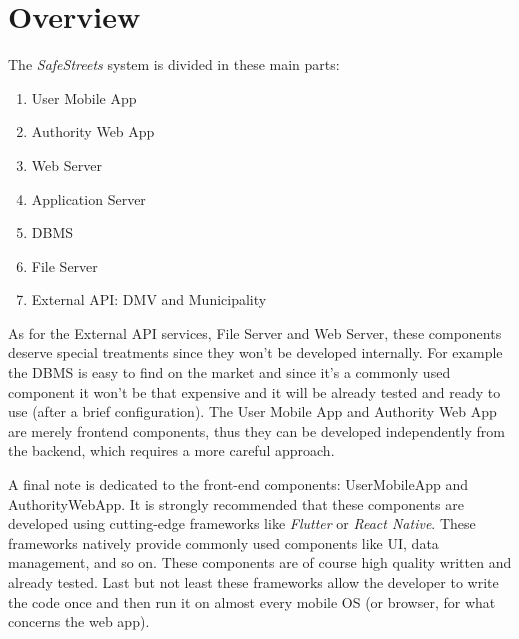 \section{Overview}
The \emph{SafeStreets} system is divided in these main parts:
\begin{enumerate}
    \item User Mobile App
    \item Authority Web App
    \item Web Server
    \item Application Server
    \item DBMS
    \item File Server
    \item External API: DMV and Municipality
\end{enumerate}

As for the External API services, File Server and Web Server, these components
deserve special treatments since they won't be developed internally. For example
the DBMS is easy to find on the market and since it's a commonly used component
it won't be that expensive and it will be already tested and ready to use (after
a brief configuration). The User Mobile App and Authority Web App are merely frontend
components, thus they can be developed independently from the backend, which
requires a more careful approach.

A final note is dedicated to the front-end components: UserMobileApp and
AuthorityWebApp. It is strongly recommended that these components are developed
using cutting-edge frameworks like \emph{Flutter} or \emph{React Native}. These
frameworks natively provide commonly used components like UI, data management,
and so on. These components are of course high quality written and already
tested. Last but not least these frameworks allow the developer to write the
code once and then run it on almost every mobile OS (or browser, for what
concerns the web app).